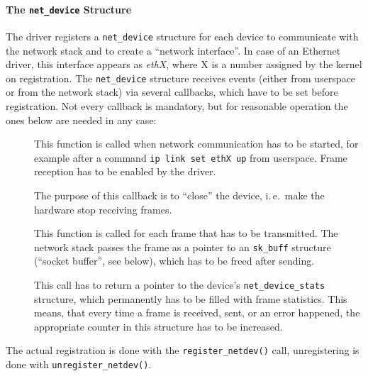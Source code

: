 \documentclass[a4paper,12pt,BCOR=6mm,bibtotoc,idxtotoc]{scrbook}
\begin{document}
\paragraph{The \lstinline+net_device+ Structure} The driver
registers a \lstinline+net_device+ structure for each device to communicate
with the network stack and to create a ``network interface''. In case of an
Ethernet driver, this interface appears as \textit{ethX}, where X is a number
assigned by the kernel on registration. The \lstinline+net_device+ structure
receives events (either from userspace or from the network stack) via several
callbacks, which have to be set before registration. Not every callback is
mandatory, but for reasonable operation the ones below are needed in any case:

\newsavebox\boxopen
\sbox{}
\newsavebox\boxstop
\sbox{}
\newsavebox\boxxmit
\sbox{}
\newsavebox\boxstats
\sbox{}

\begin{description}

\item[\usebox\boxopen] This function is called when network communication has
to be started, for example after a command \lstinline+ip link set ethX up+
from userspace. Frame reception has to be enabled by the driver.

\item[\usebox\boxstop] The purpose of this callback is to ``close'' the
device, i.\,e.\ make the hardware stop receiving frames.

\item[\usebox\boxxmit] This function is called for each frame that has to be
transmitted. The network stack passes the frame as a pointer to an
\lstinline+sk_buff+ structure (``socket buffer'', see
below), which has to be freed after sending.

\item[\usebox\boxstats] This call has to return a pointer to the device's
\lstinline+net_device_stats+ structure, which permanently has to be filled with
frame statistics. This means, that every time a frame is received, sent, or an
error happened, the appropriate counter in this structure has to be increased.

\end{description}

The actual registration is done with the \lstinline+register_netdev()+ call,
unregistering is done with \lstinline+unregister_netdev()+.
\end{document}
